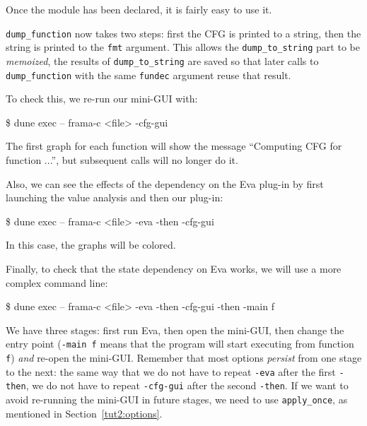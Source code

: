 Once the module has been declared, it is fairly easy to use it.


\texttt{dump\_function} now takes two steps: first the CFG is printed
to a string, then the string is printed to the \texttt{fmt}
argument. This allows the \texttt{dump\_to\_string} part to be
\emph{memoized}, \ie the results of \texttt{dump\_to\_string} are
saved so that later calls to \texttt{dump\_function} with the same
\texttt{fundec} argument reuse that result.

To check this, we re-run our mini-GUI with:

\begin{frama-c-commands}
\$ dune exec -- frama-c <file> -cfg-gui
\end{frama-c-commands}

The first graph for each function will show the message
``Computing CFG for function ...'', but subsequent calls will no longer do it.

Also, we can see the effects of the dependency on the \textsf{Eva} plug-in
by first launching the value analysis and then our plug-in:

\begin{frama-c-commands}
\$ dune exec -- frama-c <file> -eva -then -cfg-gui
\end{frama-c-commands}

In this case, the graphs will be colored.

Finally, to check that the state dependency on \textsf{Eva} works, we will use
a more complex command line:

\begin{frama-c-commands}
\$ dune exec -- frama-c <file> -eva -then -cfg-gui -then -main f
\end{frama-c-commands}

We have three stages: first run \textsf{Eva}, then open the mini-GUI, then
change the entry point (\verb|-main f| means that the program will start
executing from function \verb|f|) {\em and} re-open the mini-GUI.
Remember that most \framac options {\em persist} from one stage to the next:
the same way that we do not have to repeat \verb|-eva| after the first
\verb|-then|, we do not have to repeat \verb|-cfg-gui| after the second
\verb|-then|. If we want to avoid re-running the mini-GUI in future stages,
we need to use \texttt{apply\_once}, as mentioned in Section~\ref{tut2:options}.

